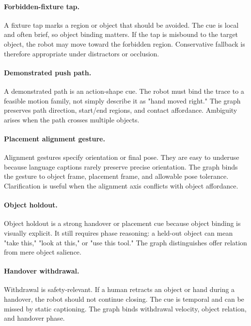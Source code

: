 \documentclass{article}
\begin{document}
\paragraph{Forbidden-fixture tap.}
A fixture tap marks a region or object that should be avoided. The cue is local and often brief, so object binding matters. If the tap is misbound to the target object, the robot may move toward the forbidden region. Conservative fallback is therefore appropriate under distractors or occlusion.

\paragraph{Demonstrated push path.}
A demonstrated path is an action-shape cue. The robot must bind the trace to a feasible motion family, not simply describe it as "hand moved right." The graph preserves path direction, start/end regions, and contact affordance. Ambiguity arises when the path crosses multiple objects.

\paragraph{Placement alignment gesture.}
Alignment gestures specify orientation or final pose. They are easy to underuse because language captions rarely preserve precise orientation. The graph binds the gesture to object frame, placement frame, and allowable pose tolerance. Clarification is useful when the alignment axis conflicts with object affordance.

\paragraph{Object holdout.}
Object holdout is a strong handover or placement cue because object binding is visually explicit. It still requires phase reasoning: a held-out object can mean "take this," "look at this," or "use this tool." The graph distinguishes offer relation from mere object salience.

\paragraph{Handover withdrawal.}
Withdrawal is safety-relevant. If a human retracts an object or hand during a handover, the robot should not continue closing. The cue is temporal and can be missed by static captioning. The graph binds withdrawal velocity, object relation, and handover phase.
\end{document}

